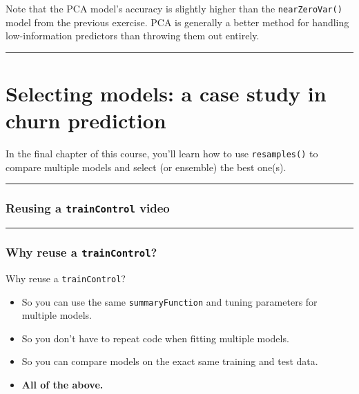 \documentclass[
]{book}
\begin{document}
Note that the PCA model's accuracy is slightly higher than the \texttt{nearZeroVar()} model from the previous exercise. PCA is generally a better method for handling low-information predictors than throwing them out entirely.

\begin{center}\rule{0.5\linewidth}{0.5pt}\end{center}

\hypertarget{selecting-models-a-case-study-in-churn-prediction}{%
\chapter{Selecting models: a case study in churn prediction}\label{selecting-models-a-case-study-in-churn-prediction}}

In the final chapter of this course, you'll learn how to use \texttt{resamples()} to compare multiple models and select (or ensemble) the best one(s).

\begin{center}\rule{0.5\linewidth}{0.5pt}\end{center}

\hypertarget{reusing-a-traincontrol-video}{%
\subsection*{\texorpdfstring{Reusing a \texttt{trainControl} video}{Reusing a trainControl video}}\label{reusing-a-traincontrol-video}}

\begin{center}\rule{0.5\linewidth}{0.5pt}\end{center}

\hypertarget{why-reuse-a-traincontrol}{%
\subsection*{\texorpdfstring{Why reuse a \texttt{trainControl}?}{Why reuse a trainControl?}}\label{why-reuse-a-traincontrol}}

Why reuse a \texttt{trainControl}?

\begin{itemize}
\item
  So you can use the same \texttt{summaryFunction} and tuning parameters for multiple models.
\item
  So you don't have to repeat code when fitting multiple models.
\item
  So you can compare models on the exact same training and test data.
\item
  \textbf{All of the above.}
\end{itemize}
\end{document}
